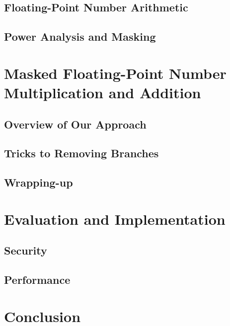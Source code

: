 \subsection{Floating-Point Number Arithmetic}


\subsection{Power Analysis and Masking}



\section{Masked Floating-Point Number Multiplication and Addition}

\subsection{Overview of Our Approach}


\subsection{Tricks to Removing Branches}



\subsection*{Wrapping-up}

%
%


\section{Evaluation and Implementation}

\subsection{Security}


\subsection{Performance}




\section{Conclusion}

